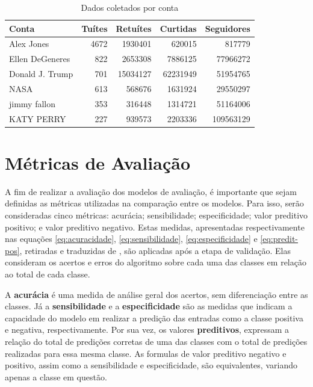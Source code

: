 \documentclass[oneside,openright,12pt]{ufsm_2015} %
\begin{document}
    \begin{table}[ht]
    \centering
    \caption{Dados coletados por conta}
    \label{tab:contas-tweets}
    \begin{tabular}{|l|r|r|r|r|}
    \hline
    \textbf{Conta}  & \multicolumn{1}{l|}{\textbf{Tuítes}} & \multicolumn{1}{l|}{\textbf{Retuítes}} & \multicolumn{1}{l|}{\textbf{Curtidas}} & \multicolumn{1}{l|}{\textbf{Seguidores}} \\ \hline
    Alex Jones      & 4672  & 1930401   & 620015    & 817779    \\ \hline
    Ellen DeGeneres & 822   & 2653308   & 7886125   & 77966272  \\ \hline
    Donald J. Trump & 701   & 15034127  & 62231949  & 51954765  \\ \hline
    NASA            & 613   & 568676    & 1631924   & 29550297  \\ \hline
    jimmy fallon    & 353   & 316448    & 1314721   & 51164006  \\ \hline
    KATY PERRY      & 227   & 939573    & 2203336   & 109563129 \\ \hline
    \end{tabular}
    \end{table}
    

\section{Métricas de Avaliação}
\label{sec:exp-class-metricas}

    \par A fim de realizar a avaliação dos modelos de avaliação, é importante que sejam definidas as métricas utilizadas na comparação entre os modelos. Para isso, serão consideradas cinco métricas: acurácia; sensibilidade; especificidade; valor preditivo positivo; e valor preditivo negativo. Estas medidas, apresentadas respectivamente nas equações \ref{eq:acuracidade}, \ref{eq:sensibilidade}, \ref{eq:especificidade} e \ref{eq:predit-pos}, retiradas e traduzidas de \cite{book:han:11}, são aplicadas após a etapa de validação. Elas consideram os acertos e erros do algoritmo sobre cada uma das classes em relação ao total de cada classe.
    
    \par A \textbf{acurácia} é uma medida de análise geral dos acertos, sem diferenciação entre as classes. Já a \textbf{sensibilidade} e a \textbf{especificidade} são as medidas que indicam a capacidade do modelo em realizar a predição das entradas como a classe positiva e negativa, respectivamente. Por sua vez, os valores \textbf{preditivos}, expressam a relação do total de predições corretas de uma das classes com o total de predições realizadas para essa mesma classe. As formulas de valor preditivo negativo e positivo, assim como a sensibilidade e especificidade, são equivalentes, variando apenas a classe em questão.
    
\end{document}
